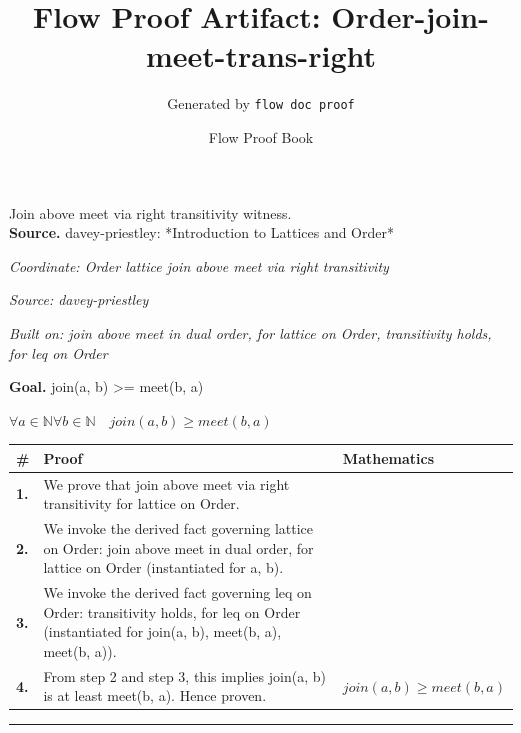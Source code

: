 \documentclass[11pt]{article}
\title{Flow Proof Artifact: Order-join-meet-trans-right}
\author{Generated by \texttt{flow doc proof}}
\date{Flow Proof Book}
\theoremstyle{definition}
\begin{document}
\maketitle
Join above meet via right transitivity witness.\\[0.5em]
\textbf{Source.} davey-priestley: *Introduction to Lattices and Order*\\[0.5em]
\bigskip
{}\par
\smallskip\noindent\textit{Coordinate: Order \cdot lattice \cdot join above meet via right transitivity}\par
\smallskip\noindent\textit{Source: davey-priestley}\par
\smallskip\noindent\textit{Built on: join above meet in dual order, for lattice on Order, transitivity holds, for leq on Order}\par
\medskip
\noindent\textbf{Goal.} join(a, b) >= meet(b, a)\par
\noindent$\displaystyle \forall a \in \mathbb{N} \forall b \in \mathbb{N}\quad join(a, b) \ge meet(b, a)$\par
\medskip
\noindent
\begin{tabular}{@{} >{\raggedright\arraybackslash}p{} >{\raggedright\arraybackslash}p{} >{\raggedleft\arraybackslash}p{} @{}}
\textbf{\#} & \textbf{Proof} & \textbf{Mathematics} \\
\midrule
\textbf{1.} & We prove that join above meet via right transitivity for lattice on Order. & \\[0.45em]
\textbf{2.} & We invoke the derived fact governing lattice on Order: join above meet in dual order, for lattice on Order (instantiated for a, b). & \\[0.45em]
\textbf{3.} & We invoke the derived fact governing leq on Order: transitivity holds, for leq on Order (instantiated for join(a, b), meet(b, a), meet(b, a)). & \\[0.45em]
\textbf{4.} & From step 2 and step 3, this implies join(a, b) is at least meet(b, a). Hence proven. & $\displaystyle join(a, b) \ge meet(b, a)$ \\[0.45em]
\bottomrule
\end{tabular}
\label{thm:Order-lattice-join_above_meet_via_right_transitivity}
\par\medskip\hrule
\end{document}
